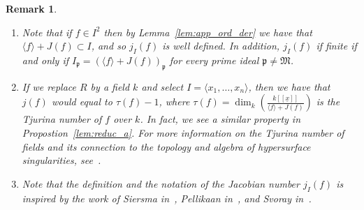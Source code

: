 \documentclass{article}
\newtheorem{lemma}[theorem]{Lemma}
\newtheorem{remark}[theorem]{Remark}
\numberwithin{theorem}{section}
\begin{document}
\begin{remark}
\begin{enumerate}
    \item \textup{Note that if $f \in I^2$ then by Lemma~\ref{lem:app_ord_der} we have that $\langle f \rangle + J(f) \subset I$, and so $j_I(f)$ is well defined. In addition, $j_I(f)$ if finite if and only if $I_\mathfrak{p} = (\langle f \rangle +J(f))_\mathfrak{p}$ for every prime ideal $\mathfrak{p} \neq \mathfrak{M}$. }
    \item \textup{If we replace $R$ by a field $k$ and select $I=\langle x_1, \dots, x_n\rangle$, then we have that $j(f)$ would equal to $\tau(f)-1$, where $\tau(f)=\dim_k(\frac{k[[\underline{x}]]}{\langle f\rangle + J(f)})$ is the Tjurina number of $f$ over $k$. In fact, we see a similar property in Propostion~\ref{lem:reduc_a}. For more information on the Tjurina number of fields and its connection to the topology and algebra of hypersurface singularities, see~\cite{greuel2007introduction, milnor2016singular, tjurina1969locally, varchenko1985singularities}.}
    \item \textup{Note that the definition and the notation of the Jacobian number $j_I(f)$ is inspired by the work of Siersma in~\cite{siersma1983isolated}, Pellikaan in~\cite{pellikaan1990deformations}, and Svoray in~\cite{svoray2024invariants}. }
\end{enumerate}
\end{remark}



\end{document}
